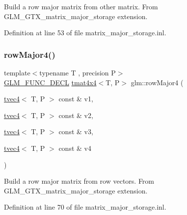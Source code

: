 Build a row major matrix from other matrix. From G\+L\+M\+\_\+\+G\+T\+X\+\_\+matrix\+\_\+major\+\_\+storage extension. 

Definition at line 53 of file matrix\+\_\+major\+\_\+storage.\+inl.

\mbox{\label{group__gtx__matrix__major__storage_ga3ce8f2a78fb2f15bf28151ee128b0ae8}} 
\subsubsection{\texorpdfstring{rowMajor4()}{rowMajor4()}\hspace{0.1cm}{\footnotesize\ttfamily [1/2]}}
{\footnotesize\ttfamily template$<$typename T , precision P$>$ \\
\mbox{\hyperlink{setup_8hpp_ab2d052de21a70539923e9bcbf6e83a51}{G\+L\+M\+\_\+\+F\+U\+N\+C\+\_\+\+D\+E\+CL}} \mbox{\hyperlink{structglm_1_1tmat4x4}{tmat4x4}}$<$T, P$>$ glm\+::row\+Major4 (\begin{DoxyParamCaption}\item[{\mbox{\hyperlink{structglm_1_1tvec4}{tvec4}}$<$ T, P $>$ const \&}]{v1,  }\item[{\mbox{\hyperlink{structglm_1_1tvec4}{tvec4}}$<$ T, P $>$ const \&}]{v2,  }\item[{\mbox{\hyperlink{structglm_1_1tvec4}{tvec4}}$<$ T, P $>$ const \&}]{v3,  }\item[{\mbox{\hyperlink{structglm_1_1tvec4}{tvec4}}$<$ T, P $>$ const \&}]{v4 }\end{DoxyParamCaption})}

Build a row major matrix from row vectors. From G\+L\+M\+\_\+\+G\+T\+X\+\_\+matrix\+\_\+major\+\_\+storage extension. 

Definition at line 70 of file matrix\+\_\+major\+\_\+storage.\+inl.

\mbox{\label{group__gtx__matrix__major__storage_ga85771a88c114a088a0414bcfce55e729}} 
